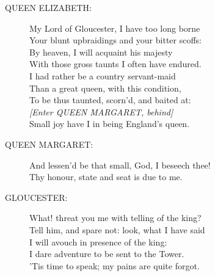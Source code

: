 \documentclass{article}
\begin{document}
\begin{description}
\item[QUEEN ELIZABETH:] 
\hspace{1pt}My Lord of Gloucester, I have too long borne\\
\hspace{1pt}Your blunt upbraidings and your bitter scoffs:\\
\hspace{1pt}By heaven, I will acquaint his majesty\\
\hspace{1pt}With those gross taunts I often have endured.\\
\hspace{1pt}I had rather be a country servant-maid\\
\hspace{1pt}Than a great queen, with this condition,\\
\hspace{1pt}To be thus taunted, scorn'd, and baited at:\\
{\it [Enter QUEEN MARGARET, behind]}\\
\hspace{1pt}Small joy have I in being England's queen.\\
\end{description}
\begin{description}
\item[QUEEN MARGARET:] 
\hspace{1pt}And lessen'd be that small, God, I beseech thee!\\
\hspace{1pt}Thy honour, state and seat is due to me.\\
\end{description}
\begin{description}
\item[GLOUCESTER:] 
\hspace{1pt}What! threat you me with telling of the king?\\
\hspace{1pt}Tell him, and spare not: look, what I have said\\
\hspace{1pt}I will avouch in presence of the king:\\
\hspace{1pt}I dare adventure to be sent to the Tower.\\
\hspace{1pt}'Tis time to speak; my pains are quite forgot.\\
\end{description}
\end{document}
